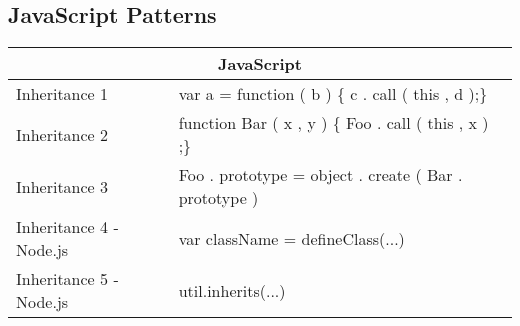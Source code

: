 \subsection{JavaScript Patterns}
\begin{tabular}{|p{5cm}|p{9cm}|}
	\hline
	\multicolumn{2}{|c|}{JavaScript}                                                                                                                                                                  \\ \hline
	Inheritance 1                  & var a = function ( b ) \{    c . call ( this , d );\}                                                                                      \\ \hline
	Inheritance 2                  & function Bar   ( x , y ) \{    Foo . call ( this , x ) ;\}                                                                                 \\ \hline
	Inheritance 3                  & Foo . prototype = object . create ( Bar . prototype )                                                                                      \\ \hline
	Inheritance 4 - Node.js        & var className = defineClass(...)                                                                                                           \\ \hline
	Inheritance 5 - Node.js        & util.inherits(...)                                                                                                                         \\ \hline
\end{tabular}